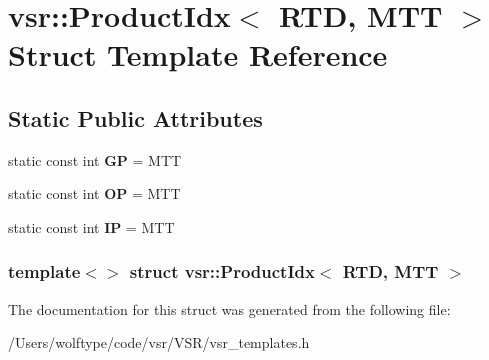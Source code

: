 \hypertarget{structvsr_1_1_product_idx_3_01_r_t_d_00_01_m_t_t_01_4}{\section{vsr\-:\-:Product\-Idx$<$ R\-T\-D, M\-T\-T $>$ Struct Template Reference}
\label{structvsr_1_1_product_idx_3_01_r_t_d_00_01_m_t_t_01_4}
}
\subsection*{Static Public Attributes}
\begin{DoxyCompactItemize}
\item 
\hypertarget{structvsr_1_1_product_idx_3_01_r_t_d_00_01_m_t_t_01_4_afd41dcf344a827325e3beb09eadf76d8}{static const int {\bfseries G\-P} = M\-T\-T}\label{structvsr_1_1_product_idx_3_01_r_t_d_00_01_m_t_t_01_4_afd41dcf344a827325e3beb09eadf76d8}

\item 
\hypertarget{structvsr_1_1_product_idx_3_01_r_t_d_00_01_m_t_t_01_4_a28b268d20bd880c58a4d76518355263f}{static const int {\bfseries O\-P} = M\-T\-T}\label{structvsr_1_1_product_idx_3_01_r_t_d_00_01_m_t_t_01_4_a28b268d20bd880c58a4d76518355263f}

\item 
\hypertarget{structvsr_1_1_product_idx_3_01_r_t_d_00_01_m_t_t_01_4_ae9af362f56a86d30afe59db5f63f2502}{static const int {\bfseries I\-P} = M\-T\-T}\label{structvsr_1_1_product_idx_3_01_r_t_d_00_01_m_t_t_01_4_ae9af362f56a86d30afe59db5f63f2502}

\end{DoxyCompactItemize}
\subsubsection*{template$<$$>$ struct vsr\-::\-Product\-Idx$<$ R\-T\-D, M\-T\-T $>$}



The documentation for this struct was generated from the following file\-:\begin{DoxyCompactItemize}
\item 
/\-Users/wolftype/code/vsr/\-V\-S\-R/vsr\-\_\-templates.\-h\end{DoxyCompactItemize}
